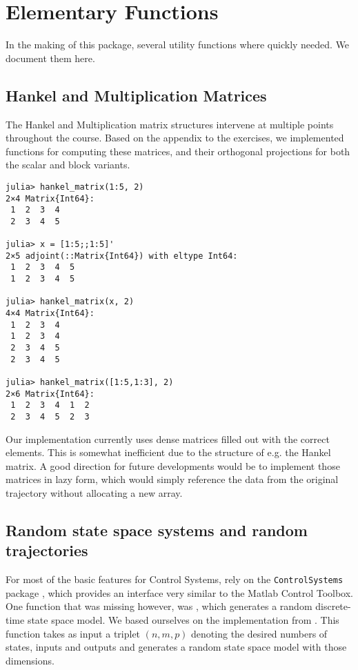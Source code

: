 \documentclass[11pt]{article}
\begin{document}
\section{Elementary Functions}
In the making of this package, several utility functions where quickly needed. We document them here.
\subsection*{Hankel and Multiplication Matrices}
The Hankel and Multiplication matrix structures intervene at multiple points throughout the course. Based on the appendix to the exercises, we implemented functions for computing these matrices, and their orthogonal projections for both the scalar and block variants.

\begin{codebox}
\begin{verbatim}
julia> hankel_matrix(1:5, 2)
2×4 Matrix{Int64}:
 1  2  3  4
 2  3  4  5

julia> x = [1:5;;1:5]'
2×5 adjoint(::Matrix{Int64}) with eltype Int64:
 1  2  3  4  5
 1  2  3  4  5

julia> hankel_matrix(x, 2)
4×4 Matrix{Int64}:
 1  2  3  4
 1  2  3  4
 2  3  4  5
 2  3  4  5

julia> hankel_matrix([1:5,1:3], 2)
2×6 Matrix{Int64}:
 1  2  3  4  1  2
 2  3  4  5  2  3 
\end{verbatim}
\end{codebox}

Our implementation currently uses dense matrices filled out with the correct elements. This is somewhat inefficient due to the structure of e.g. the Hankel matrix. A good direction for future developments would be to implement those matrices in lazy form, which would simply reference the data from the original trajectory without allocating a new array. 

\subsection*{Random state space systems and random trajectories}
For most of the basic features for Control Systems, rely on the \texttt{ControlSystems} package \cite{controlsystems_jl}, which provides an interface very similar to the Matlab Control Toolbox. One function that was missing however, was , which generates a random discrete-time state space model. We based ourselves on the implementation from \cite{python-control}. This function takes as input a triplet $(n,m,p)$ denoting the desired numbers of states, inputs and outputs and generates a random state space model with those dimensions.
\end{document}
